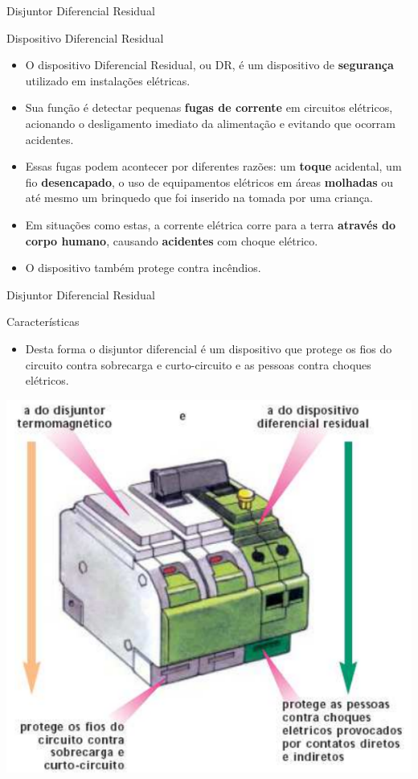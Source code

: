\begin{frame}{Disjuntor Diferencial Residual}
	\begin{block}{Dispositivo Diferencial Residual}

		\begin{itemize}
			\item O dispositivo Diferencial Residual, ou DR, é um dispositivo de \textbf{segurança} utilizado em instalações elétricas.
			\item Sua função é detectar pequenas \textbf{fugas de corrente} em circuitos elétricos, acionando o desligamento imediato da alimentação e evitando que ocorram acidentes.
			\item Essas fugas podem acontecer por diferentes razões: um \textbf{toque} acidental, um fio \textbf{desencapado}, o uso de equipamentos elétricos em áreas \textbf{molhadas} ou até mesmo um brinquedo que foi inserido na tomada por uma criança.
			\item Em situações como estas, a corrente elétrica corre para a terra \textbf{através do corpo humano}, causando \textbf{acidentes} com choque elétrico.
			\item O dispositivo também protege contra incêndios.
		\end{itemize}
	\end{block}

\end{frame}


\begin{frame}{Disjuntor Diferencial Residual}
	\begin{block}{Características}

		\begin{itemize}
			\item Desta forma o disjuntor diferencial é um dispositivo que protege os fios do circuito contra sobrecarga e curto-circuito e as pessoas contra choques elétricos.
		\end{itemize}
	\end{block}

	\centering
	\includegraphics[width=0.5\linewidth]{Figuras/Ch04/fig3}
\end{frame}


